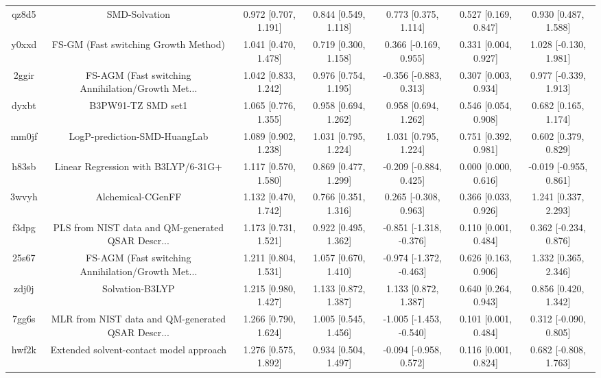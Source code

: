 \documentclass{article}
\begin{document}
\begin{center}
\begin{longtable}{|ccccccc|}
 qz8d5 &                                      SMD-Solvation &  0.972 [0.707, 1.191] &  0.844 [0.549, 1.118] &     0.773 [0.375, 1.114] &  0.527 [0.169, 0.847] &    0.930 [0.487, 1.588] \\
 y0xxd &               FS-GM (Fast switching Growth Method) &  1.041 [0.470, 1.478] &  0.719 [0.300, 1.158] &    0.366 [-0.169, 0.955] &  0.331 [0.004, 0.927] &   1.028 [-0.130, 1.981] \\
 2ggir &  FS-AGM (Fast switching Annihilation/Growth Met... &  1.042 [0.833, 1.242] &  0.976 [0.754, 1.195] &   -0.356 [-0.883, 0.313] &  0.307 [0.003, 0.934] &   0.977 [-0.339, 1.913] \\
 dyxbt &                                 B3PW91-TZ SMD set1 &  1.065 [0.776, 1.355] &  0.958 [0.694, 1.262] &     0.958 [0.694, 1.262] &  0.546 [0.054, 0.908] &    0.682 [0.165, 1.174] \\
 mm0jf &                       LogP-prediction-SMD-HuangLab &  1.089 [0.902, 1.238] &  1.031 [0.795, 1.224] &     1.031 [0.795, 1.224] &  0.751 [0.392, 0.981] &    0.602 [0.379, 0.829] \\
 h83sb &                Linear Regression with B3LYP/6-31G+ &  1.117 [0.570, 1.580] &  0.869 [0.477, 1.299] &   -0.209 [-0.884, 0.425] &  0.000 [0.000, 0.616] &  -0.019 [-0.955, 0.861] \\
 3wvyh &                                  Alchemical-CGenFF &  1.132 [0.470, 1.742] &  0.766 [0.351, 1.316] &    0.265 [-0.308, 0.963] &  0.366 [0.033, 0.926] &    1.241 [0.337, 2.293] \\
 f3dpg &  PLS from NIST data and QM-generated QSAR Descr... &  1.173 [0.731, 1.521] &  0.922 [0.495, 1.362] &  -0.851 [-1.318, -0.376] &  0.110 [0.001, 0.484] &   0.362 [-0.234, 0.876] \\
 25s67 &  FS-AGM (Fast switching Annihilation/Growth Met... &  1.211 [0.804, 1.531] &  1.057 [0.670, 1.410] &  -0.974 [-1.372, -0.463] &  0.626 [0.163, 0.906] &    1.332 [0.365, 2.346] \\
 zdj0j &                                    Solvation-B3LYP &  1.215 [0.980, 1.427] &  1.133 [0.872, 1.387] &     1.133 [0.872, 1.387] &  0.640 [0.264, 0.943] &    0.856 [0.420, 1.342] \\
 7gg6s &  MLR from NIST data and QM-generated QSAR Descr... &  1.266 [0.790, 1.624] &  1.005 [0.545, 1.456] &  -1.005 [-1.453, -0.540] &  0.101 [0.001, 0.484] &   0.312 [-0.090, 0.805] \\
 hwf2k &            Extended solvent-contact model approach &  1.276 [0.575, 1.892] &  0.934 [0.504, 1.497] &   -0.094 [-0.958, 0.572] &  0.116 [0.001, 0.824] &   0.682 [-0.808, 1.763] \\

\end{longtable}
\end{center}
\end{document}
